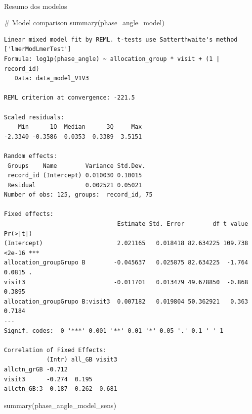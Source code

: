 \documentclass[
  12pt,
]{article}
\makeatletter
\let\oldparagraph\paragraph
\renewcommand{\paragraph}{
    \@ifstar
      \xxxParagraphStar
      \xxxParagraphNoStar
  }
\newcommand{\xxxParagraphStar}[1]{\oldparagraph*{#1}\mbox{}}
\newcommand{\xxxParagraphNoStar}[1]{\oldparagraph{#1}\mbox{}}
\newenvironment{Shaded}{\begin{snugshade}}{\end{snugshade}}
\newcommand{\CommentTok}[1]{\textcolor[rgb]{0.37,0.37,0.37}{#1}}
\newcommand{\FunctionTok}[1]{\textcolor[rgb]{0.28,0.35,0.67}{#1}}
\newcommand{\NormalTok}[1]{\textcolor[rgb]{0.00,0.23,0.31}{#1}}
\makeatother
\begin{document}
\paragraph{Resumo dos modelos}\label{resumo-dos-modelos-17}

\begin{Shaded}
\begin{Highlighting}[]
\CommentTok{\# Model comparison}
\FunctionTok{summary}\NormalTok{(phase\_angle\_model)}
\end{Highlighting}
\end{Shaded}

\begin{verbatim}
Linear mixed model fit by REML. t-tests use Satterthwaite's method ['lmerModLmerTest']
Formula: log1p(phase_angle) ~ allocation_group * visit + (1 | record_id)
   Data: data_model_V1V3

REML criterion at convergence: -221.5

Scaled residuals: 
    Min      1Q  Median      3Q     Max 
-2.3340 -0.3586  0.0353  0.3389  3.5151 

Random effects:
 Groups    Name        Variance Std.Dev.
 record_id (Intercept) 0.010030 0.10015 
 Residual              0.002521 0.05021 
Number of obs: 125, groups:  record_id, 75

Fixed effects:
                                Estimate Std. Error        df t value Pr(>|t|)    
(Intercept)                     2.021165   0.018418 82.634225 109.738   <2e-16 ***
allocation_groupGrupo B        -0.045637   0.025875 82.634225  -1.764   0.0815 .  
visit3                         -0.011701   0.013479 49.678850  -0.868   0.3895    
allocation_groupGrupo B:visit3  0.007182   0.019804 50.362921   0.363   0.7184    
---
Signif. codes:  0 '***' 0.001 '**' 0.01 '*' 0.05 '.' 0.1 ' ' 1

Correlation of Fixed Effects:
            (Intr) all_GB visit3
allctn_grGB -0.712              
visit3      -0.274  0.195       
allctn_GB:3  0.187 -0.262 -0.681
\end{verbatim}

\begin{Shaded}
\begin{Highlighting}[]
\FunctionTok{summary}\NormalTok{(phase\_angle\_model\_sens)}
\end{Highlighting}
\end{Shaded}
\end{document}

